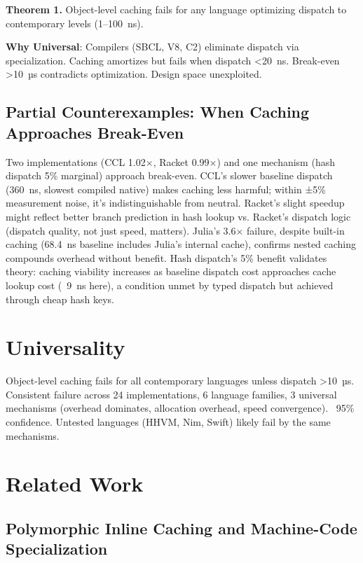 \documentclass[sigplan,final,acmsmall,review,screen]{acmart}
\begin{document}
\begin{boxedtheorem}
\textbf{Theorem 1.} Object-level caching fails for any language optimizing dispatch to contemporary levels (1--100~ns).
\end{boxedtheorem}

\textbf{Why Universal}: Compilers (SBCL, V8, C2) eliminate dispatch via specialization. Caching amortizes but fails when dispatch <20~ns. Break-even >10~µs contradicts optimization. Design space unexploited.

\subsection{Partial Counterexamples: When Caching Approaches Break-Even}
\label{sec:counterexamples}

Two implementations (CCL 1.02×, Racket 0.99×) and one mechanism (hash dispatch 5\% marginal) approach break-even. CCL's slower baseline dispatch (360~ns, slowest compiled native) makes caching less harmful; within ±5\% measurement noise, it's indistinguishable from neutral. Racket's slight speedup might reflect better branch prediction in hash lookup vs. Racket's dispatch logic (dispatch quality, not just speed, matters). Julia's 3.6× failure, despite built-in caching (68.4~ns baseline includes Julia's internal cache), confirms nested caching compounds overhead without benefit. Hash dispatch's 5\% benefit validates theory: caching viability increases as baseline dispatch cost approaches cache lookup cost (~9~ns here), a condition unmet by typed dispatch but achieved through cheap hash keys.

\section{Universality}

Object-level caching fails for all contemporary languages unless dispatch >10~µs. Consistent failure across 24 implementations, 6 language families, 3 universal mechanisms (overhead dominates, allocation overhead, speed convergence). ~95\% confidence. Untested languages (HHVM, Nim, Swift) likely fail by the same mechanisms.

\section{Related Work}

\subsection{Polymorphic Inline Caching and Machine-Code Specialization}
\end{document}
